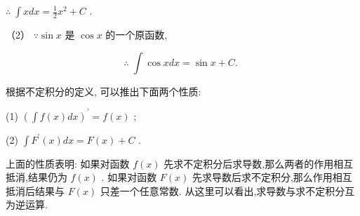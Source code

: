 \documentclass[lang=cn,newtx,10pt,scheme=chinese]{elegantbook}
\begin{document}
\(\therefore \;\int {xdx} = \frac{1}{2}{x}^{2} + C\) .

（2） \(\because \sin x\) 是 \(\cos x\) 的一个原函数,

\[
\therefore \;\int \cos {xdx} = \sin x + C\text{. }
\]

\begin{proposition}[不定积分的性质]

根据不定积分的定义, 可以推出下面两个性质:

(1) \({\left( \int f\left( x\right) dx\right) }^{\prime } = f\left( x\right)\) ;

(2) \(\int {F}^{\prime }\left( x\right) {dx} = F\left( x\right) + C\) .

\end{proposition}

上面的性质表明: 如果对函数 \(f\left( x\right)\) 先求不定积分后求导数,那么两者的作用相互抵消,结果仍为 \(f\left( x\right)\) . 如果对函数 \(F\left( x\right)\) 先求导数后求不定积分,那么作用相互抵消后结果与 \(F\left( x\right)\) 只差一个任意常数. 从这里可以看出,求导数与求不定积分互为逆运算.
\end{document}
